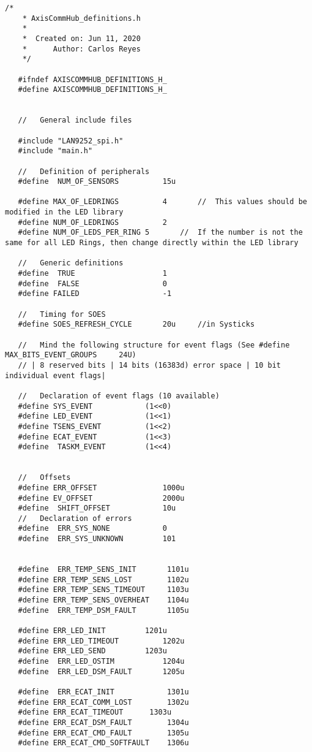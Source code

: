 \begin{lstlisting}[label=lst:definitions,caption={Main definition and configuration header file.}]
    /*
    * AxisCommHub_definitions.h
    *
    *  Created on: Jun 11, 2020
    *      Author: Carlos Reyes
    */
   
   #ifndef AXISCOMMHUB_DEFINITIONS_H_
   #define AXISCOMMHUB_DEFINITIONS_H_
   
   
   //	General include files
   
   #include "LAN9252_spi.h"
   #include "main.h"
   
   //	Definition of peripherals
   #define	NUM_OF_SENSORS			15u
   
   #define MAX_OF_LEDRINGS			4		//	This values should be modified in the LED library
   #define NUM_OF_LEDRINGS			2
   #define NUM_OF_LEDS_PER_RING	5		//	If the number is not the same for all LED Rings, then change directly within the LED library
   
   //	Generic definitions
   #define	TRUE					1
   #define	FALSE					0
   #define FAILED					-1
   
   //	Timing for SOES
   #define SOES_REFRESH_CYCLE		20u		//in Systicks
   
   // 	Mind the following structure for event flags (See #define MAX_BITS_EVENT_GROUPS     24U)
   // | 8 reserved bits | 14 bits (16383d) error space | 10 bit individual event flags|
   
   //	Declaration of event flags (10 available)
   #define SYS_EVENT			(1<<0)
   #define LED_EVENT			(1<<1)
   #define TSENS_EVENT			(1<<2)
   #define ECAT_EVENT			(1<<3)
   #define	TASKM_EVENT			(1<<4)
   
   
   //	Offsets
   #define ERR_OFFSET				1000u
   #define EV_OFFSET				2000u
   #define	SHIFT_OFFSET			10u
   //	Declaration of errors
   #define	ERR_SYS_NONE			0
   #define	ERR_SYS_UNKNOWN			101
   
   
   #define	ERR_TEMP_SENS_INIT		 1101u
   #define ERR_TEMP_SENS_LOST		 1102u
   #define ERR_TEMP_SENS_TIMEOUT	 1103u
   #define ERR_TEMP_SENS_OVERHEAT	 1104u
   #define	ERR_TEMP_DSM_FAULT		 1105u
   
   #define ERR_LED_INIT		 	1201u
   #define ERR_LED_TIMEOUT		 	1202u
   #define ERR_LED_SEND		 	1203u
   #define	ERR_LED_OSTIM		 	1204u
   #define	ERR_LED_DSM_FAULT	 	1205u
   
   #define	ERR_ECAT_INIT			 1301u
   #define ERR_ECAT_COMM_LOST		 1302u
   #define ERR_ECAT_TIMEOUT		 1303u
   #define ERR_ECAT_DSM_FAULT		 1304u
   #define ERR_ECAT_CMD_FAULT		 1305u
   #define ERR_ECAT_CMD_SOFTFAULT	 1306u
   

\end{lstlisting}
